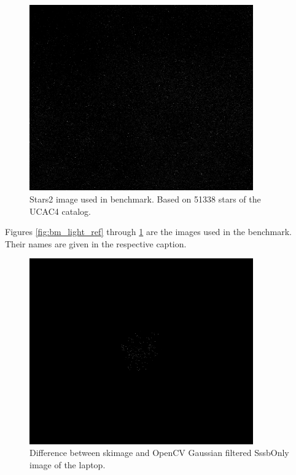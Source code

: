\begin{figure}[htb]
    \begin{center}
        \includegraphics[height=8cm]{doc/thesis/0_figures/cv_skimage/Stars_2017-08-15T115857-362000.png}
    \end{center}
    \caption{Stars2 image used in benchmark. Based on 51338 stars of the UCAC4 catalog.}
    \label{fig:bm_stars2}
\end{figure}

Figures \ref{fig:bm_light_ref} through \ref{fig:bm_stars2} are the images used in the benchmark. Their names are given in the respective caption.

\begin{figure}[htb]
    \begin{center}
        \includegraphics[height=8cm]{doc/thesis/0_figures/cv_skimage/diff_laptop.png}
    \end{center}
    \caption{Difference between \gls{skimage} and OpenCV Gaussian filtered SssbOnly image of the laptop.}
    \label{fig:bm_diff_laptop}
\end{figure}


